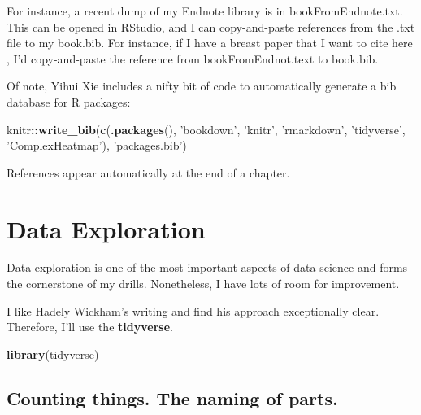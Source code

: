 \documentclass[]{book}
\newenvironment{Shaded}{\begin{snugshade}}{\end{snugshade}}
\newcommand{\KeywordTok}[1]{\textcolor[rgb]{0.13,0.29,0.53}{\textbf{#1}}}
\newcommand{\NormalTok}[1]{#1}
\newcommand{\OperatorTok}[1]{\textcolor[rgb]{0.81,0.36,0.00}{\textbf{#1}}}
\newcommand{\StringTok}[1]{\textcolor[rgb]{0.31,0.60,0.02}{#1}}
\begin{document}
For instance, a recent dump of my Endnote library is in bookFromEndnote.txt. This can be opened in RStudio, and I can copy-and-paste references from the .txt file to my book.bib. For instance, if I have a breast paper that I want to cite here \citep{RN2750}, I'd copy-and-paste the reference from bookFromEndnot.text to book.bib.

Of note, Yihui Xie includes a nifty bit of code to automatically generate a bib database for R packages:

\begin{Shaded}
\begin{Highlighting}[]
\NormalTok{knitr}\OperatorTok{::}\KeywordTok{write_bib}\NormalTok{(}\KeywordTok{c}\NormalTok{(}\KeywordTok{.packages}\NormalTok{(), }\StringTok{'bookdown'}\NormalTok{, }\StringTok{'knitr'}\NormalTok{, }\StringTok{'rmarkdown'}\NormalTok{, }\StringTok{'tidyverse'}\NormalTok{, }\StringTok{'ComplexHeatmap'}\NormalTok{), }\StringTok{'packages.bib'}\NormalTok{)}
\end{Highlighting}
\end{Shaded}

References appear automatically at the end of a chapter.

\hypertarget{dataexploration}{%
\chapter{Data Exploration}\label{dataexploration}}

Data exploration is one of the most important aspects of data science and forms the cornerstone of my drills. Nonetheless, I have lots of room for improvement.

I like Hadely Wickham's writing and find his approach exceptionally clear. Therefore, I'll use the \textbf{tidyverse}.

\begin{Shaded}
\begin{Highlighting}[]
\KeywordTok{library}\NormalTok{(tidyverse)}
\end{Highlighting}
\end{Shaded}

\hypertarget{counting-things.-the-naming-of-parts.}{%
\section{Counting things. The naming of parts.}\label{counting-things.-the-naming-of-parts.}}
\end{document}
